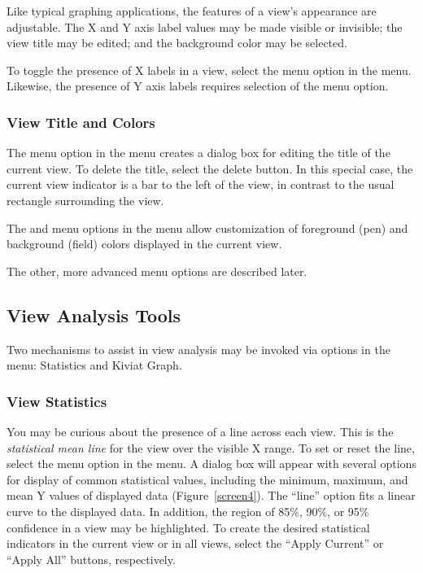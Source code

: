 Like typical graphing applications, the features of a view's appearance are
adjustable. The X and Y axis label values may be made visible or invisible;
the view title may be edited; and the background color may be selected.

To toggle the presence of X labels in a view, select the 
menu option in the  menu.  Likewise, the presence of Y axis labels
requires selection of the  menu option.

\subsubsection{View Title and Colors}

The  menu option in the  menu creates a dialog box for
editing the title of the current view. To delete the title, select the delete
button. In this special case, the current view indicator is a bar to the left of
the view, in contrast to the usual rectangle surrounding the view.

The  and  menu options in the
 menu allow customization of foreground (pen) and background (field)
colors displayed in the current view.

The other, more advanced  menu options are described later.


\subsection{View Analysis Tools}

Two mechanisms to assist in view analysis may be invoked via options in
the  menu: Statistics and Kiviat Graph.

\subsubsection{View Statistics}

You may be curious about the presence of a line across each view. This is the
{\em statistical mean line} for the view over the visible X range. To set or
reset the line, select the  menu option in the 
menu. A dialog box will appear with several options for display of common
statistical values, including the minimum, maximum, and mean Y values of
displayed data (Figure~\ref{screen4}). The ``line'' option fits a linear curve
to the displayed data.  In addition, the region of 85\%, 90\%, or 95\%
confidence in a view may be highlighted. To create the desired statistical
indicators in the current view or in all views, select the ``Apply Current'' or
``Apply All'' buttons, respectively.

